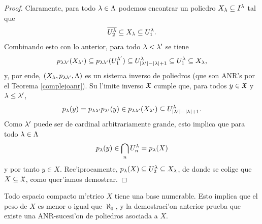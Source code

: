 \begin{proof}
  Claramente, para todo $ \lambda\in \Lambda  $ podemos encontrar un poliedro $ X_\lambda\subseteq I^\lambda  $ tal que 
  \begin{gather*}
    \overline{U_2^\lambda }\subseteq X_\lambda \subseteq U_1^\lambda.
  \end{gather*}
  Combinando esto con lo anterior, para todo $ \lambda<\lambda'  $ se tiene 
  \begin{gather*}
    p_{\lambda\lambda'}(X_{\lambda'}) \subseteq p_{\lambda\lambda'}(U_{1}^{\lambda'}) \subseteq U^\lambda_{\abs{\lambda'}-\abs{\lambda}+1} \subseteq U_1^\lambda \subseteq X_\lambda,
  \end{gather*}
  y, por ende, $ (X_\lambda,p_{\lambda\lambda'},\Lambda ) $ es un sistema inverso de poliedros (que son ANR's por el Teorema \ref{complejoanr}). Su l'imite inverso $ \mathfrak{X}  $ cumple que, para todos $ y\in \mathfrak{X}  $ y $ \lambda\leq\lambda'$,
  \begin{gather*}
    p_\lambda(y) = p_{\lambda\lambda'}p_{\lambda'}(y) \in p_{\lambda\lambda'}(X_{\lambda'}) \subseteq U^\lambda_{\abs{\lambda'}-\abs{\lambda}+1}.
  \end{gather*}
  Como $ \lambda'  $ puede ser de cardinal arbitrariamente grande, esto implica que para todo $ \lambda\in \Lambda  $ 
  \begin{gather*}
    p_\lambda(y)\in \bigcap_n U^\lambda_n = p_\lambda(X)
  \end{gather*}
  y por tanto $ y\in X  $. Rec'iprocamente, $ p_\lambda (X)\subseteq U_2^\lambda \subseteq X_\lambda  $, de donde se colige que $ X\subseteq \mathfrak{X}  $, como quer'iamos demostrar.
\end{proof}

\begin{observation}
  Todo espacio compacto m'etrico $ X  $ tiene una base numerable. Esto implica que el peso de $ X  $ es menor o igual que $ \aleph_0  $, y la demostraci'on anterior prueba que existe una ANR-sucesi'on de poliedros asociada a $ X  $.
\end{observation}

